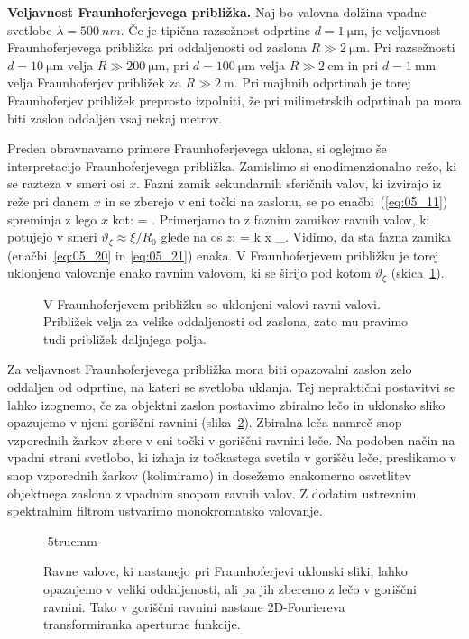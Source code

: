 \begin{example}{\bf Veljavnost Fraunhoferjevega približka.}
Naj bo valovna dolžina vpadne svetlobe $\lambda=500~\si{nm}$. Če je tipična 
razsežnost odprtine $d = 1~\si{\micro\metre}$, je veljavnost 
Fraunhoferjevega približka pri oddaljenosti od zaslona 
$R\gg 2~\si{\micro\metre}$. Pri razsežnosti
$d = 10~\si{\micro\metre}$ velja $R\gg 200~\si{\micro\metre}$, 
pri $d = 100~\si{\micro\metre}$ velja $R\gg 2~\si{\centi\metre}$ in 
pri $d = 1~\si{\milli\metre}$ velja Fraunhoferjev približek za
$R\gg 2~\si{\metre}$. Pri majhnih odprtinah je torej Fraunhoferjev približek
preprosto izpolniti, že pri milimetrskih odprtinah
pa mora biti zaslon oddaljen vsaj nekaj metrov. 
\end{example}

Preden obravnavamo primere Fraunhoferjevega uklona, si oglejmo še interpretacijo 
Fraunhoferjevega približka. Zamislimo si enodimenzionalno režo, ki se razteza v smeri 
osi $x$. Fazni zamik sekundarnih sferičnih valov, ki izvirajo iz reže pri danem $x$ 
in se zberejo v eni točki na zaslonu, se po enačbi~(\ref{eq:05_11}) spreminja z lego $x$ kot:
\beq
\Delta \phi = .
\label{eq:05_20}
\eeq
Primerjamo to z faznim zamikov ravnih valov, ki potujejo v smeri $\vartheta_\xi \approx
\xi/R_0$ glede na os $z$:
\beq
\Delta \phi = k x \vartheta_\xi.
\label{eq:05_21}
\eeq
Vidimo, da sta fazna zamika (enačbi~\ref{eq:05_20} in \ref{eq:05_21}) enaka. 
V Fraunhoferjevem približku je torej uklonjeno valovanje
enako ravnim valovom, ki se širijo pod kotom $\vartheta_\xi$ 
(skica~\ref{fig:05_ravnivalovi}).
\begin{figure}[h]
\centering
\def\svgwidth{75truemm} 

\caption{V Fraunhoferjevem približku so uklonjeni valovi ravni valovi. Približek
velja za velike oddaljenosti od zaslona, zato mu pravimo tudi približek
daljnjega polja.}
\label{fig:05_ravnivalovi}
\end{figure}

Za veljavnost Fraunhoferjevega približka mora biti opazovalni zaslon zelo
oddaljen od odprtine, na kateri se svetloba uklanja. Tej nepraktični 
postavitvi se lahko izognemo, če za objektni zaslon postavimo zbiralno 
lečo in uklonsko sliko opazujemo v njeni goriščni ravnini (slika~\ref{fig:05_2DFourier}). 
Zbiralna leča namreč snop vzporednih žarkov zbere v eni 
točki v goriščni ravnini leče. Na podoben način na vpadni strani svetlobo, ki 
izhaja iz točkastega svetila v gorišču leče, preslikamo v snop vzporednih žarkov (kolimiramo)
in dosežemo enakomerno osvetlitev
objektnega zaslona z vpadnim snopom ravnih valov.
Z dodatim ustreznim spektralnim filtrom ustvarimo 
monokromatsko valovanje.
\begin{figure}[ht]
\centering
\def\svgwidth{80truemm} 

\caption{Ravne valove, ki nastanejo pri Fraunhoferjevi uklonski sliki, lahko opazujemo v
veliki oddaljenosti, ali pa jih zberemo z lečo v goriščni ravnini. Tako v goriščni
ravnini nastane 2D-Fouriereva transformiranka aperturne funkcije.}
\label{fig:05_2DFourier}
\vglue-5truemm
\end{figure}

